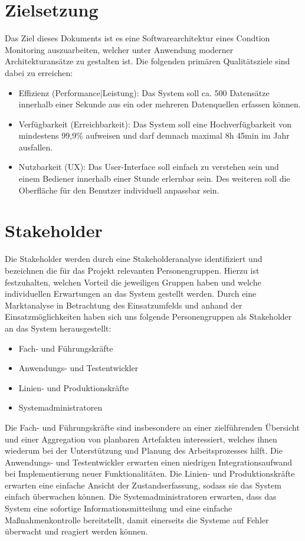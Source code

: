 \section{Zielsetzung}
Das Ziel dieses Dokuments ist es eine Softwarearchitektur eines Condtion Monitoring auszuarbeiten, welcher unter Anwendung moderner Architekturansätze zu gestalten ist. Die folgenden primären Qualitätsziele sind dabei zu erreichen:
\begin{itemize}
	\item Effizienz (Performance|Leistung): Das System soll ca. 500 Datensätze innerhalb einer Sekunde aus ein oder mehreren Datenquellen erfassen können.
 	\item Verfügbarkeit (Erreichbarkeit): Das System soll eine Hochverfügbarkeit von mindestens 99,9\% aufweisen und darf demnach maximal 8h 45min im Jahr ausfallen.
 	\item Nutzbarkeit (UX): Das User-Interface soll einfach zu verstehen sein und einem Bediener innerhalb einer Stunde erlernbar sein. Des weiteren soll die Oberfläche für den Benutzer individuell anpassbar sein.
\end{itemize}

\section{Stakeholder}
Die Stakeholder werden durch eine Stakeholderanalyse identifiziert und bezeichnen die für das Projekt relevanten Personengruppen. 
Hierzu ist festzuhalten, welchen Vorteil die jeweiligen Gruppen haben und welche individuellen Erwartungen an das System gestellt werden. Durch eine Marktanalyse in Betrachtung des Einsatzumfelds und anhand der Einsatzmöglichkeiten haben sich uns folgende Personengruppen als Stakeholder an das System herausgestellt:
\begin{itemize}
	\item Fach- und Führungskräfte
	\item Anwendungs- und Testentwickler
	\item Linien- und Produktionskräfte
	\item Systemadministratoren
\end{itemize}
Die Fach- und Führungskräfte sind insbesondere an einer zielführenden Übersicht und einer Aggregation von planbaren Artefakten interessiert, welches ihnen wiederum bei der Unterstützung und Planung des Arbeitsprozesses hilft.   
Die Anwendungs- und Testentwickler erwarten einen niedrigen Integrationsaufwand bei Implementierung neuer Funktionalitäten. 
Die Linien- und Produktionskräfte erwarten eine einfache Ansicht der Zustandserfassung, sodass sie das System einfach überwachen können.
Die Systemadministratoren erwarten, dass das System eine sofortige Informationsmitteilung und eine einfache Maßnahmenkontrolle bereitstellt, damit einerseits die Systeme auf Fehler überwacht und reagiert werden können.
